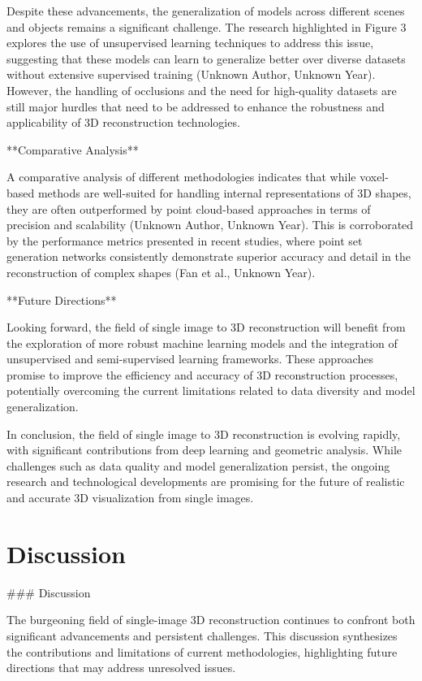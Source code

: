 \documentclass[conference]{IEEEtran}
\begin{document}
Despite these advancements, the generalization of models across different scenes and objects remains a significant challenge. The research highlighted in Figure 3 explores the use of unsupervised learning techniques to address this issue, suggesting that these models can learn to generalize better over diverse datasets without extensive supervised training (Unknown Author, Unknown Year). However, the handling of occlusions and the need for high-quality datasets are still major hurdles that need to be addressed to enhance the robustness and applicability of 3D reconstruction technologies.

**Comparative Analysis**

A comparative analysis of different methodologies indicates that while voxel-based methods are well-suited for handling internal representations of 3D shapes, they are often outperformed by point cloud-based approaches in terms of precision and scalability (Unknown Author, Unknown Year). This is corroborated by the performance metrics presented in recent studies, where point set generation networks consistently demonstrate superior accuracy and detail in the reconstruction of complex shapes (Fan et al., Unknown Year).

**Future Directions**

Looking forward, the field of single image to 3D reconstruction will benefit from the exploration of more robust machine learning models and the integration of unsupervised and semi-supervised learning frameworks. These approaches promise to improve the efficiency and accuracy of 3D reconstruction processes, potentially overcoming the current limitations related to data diversity and model generalization.

In conclusion, the field of single image to 3D reconstruction is evolving rapidly, with significant contributions from deep learning and geometric analysis. While challenges such as data quality and model generalization persist, the ongoing research and technological developments are promising for the future of realistic and accurate 3D visualization from single images.

\section{Discussion}

### Discussion

The burgeoning field of single-image 3D reconstruction continues to confront both significant advancements and persistent challenges. This discussion synthesizes the contributions and limitations of current methodologies, highlighting future directions that may address unresolved issues.
\end{document}
